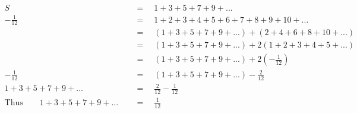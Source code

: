 \begin{align*}
S\quad&\,=\quad1+3+5+7+9+...\\
-\frac{1}{12}\quad&\,=\quad1+2+3+4+5+6+7+8+9+10+...\\
\,&\,=\quad(1+3+5+7+9+...)+(2+4+6+8+10+...)\\
\,&\,=\quad(1+3+5+7+9+...)+2(1+2+3+4+5+...)\\
\,&\,=\quad(1+3+5+7+9+...)+2\left(-\frac{1}{12}\right)\\
-\frac{1}{12}\quad&\,=\quad(1+3+5+7+9+...)-\frac{2}{12}\\
1+3+5+7+9+...\quad&\,=\quad\frac{2}{12}-\frac{1}{12}\\
\mathrm{Thus}\qquad1+3+5+7+9+...\quad&\,=\quad\frac{1}{12}
\end{align*}
